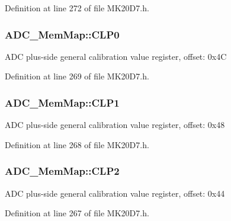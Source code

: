 Definition at line 272 of file M\+K20\+D7.\+h.

\subsubsection[{\texorpdfstring{C\+L\+P0}{CLP0}}]{ A\+D\+C\+\_\+\+Mem\+Map\+::\+C\+L\+P0}\hypertarget{struct_a_d_c___mem_map_a936082703bd7b18447b8edeeaa3c0c4f}{}\label{struct_a_d_c___mem_map_a936082703bd7b18447b8edeeaa3c0c4f}
A\+DC plus-\/side general calibration value register, offset\+: 0x4C 

Definition at line 269 of file M\+K20\+D7.\+h.

\subsubsection[{\texorpdfstring{C\+L\+P1}{CLP1}}]{ A\+D\+C\+\_\+\+Mem\+Map\+::\+C\+L\+P1}\hypertarget{struct_a_d_c___mem_map_ae99b44e06b93a2b62451162abe0aae92}{}\label{struct_a_d_c___mem_map_ae99b44e06b93a2b62451162abe0aae92}
A\+DC plus-\/side general calibration value register, offset\+: 0x48 

Definition at line 268 of file M\+K20\+D7.\+h.

\subsubsection[{\texorpdfstring{C\+L\+P2}{CLP2}}]{ A\+D\+C\+\_\+\+Mem\+Map\+::\+C\+L\+P2}\hypertarget{struct_a_d_c___mem_map_aac028a79faac6929bebb1b677b2fbf8b}{}\label{struct_a_d_c___mem_map_aac028a79faac6929bebb1b677b2fbf8b}
A\+DC plus-\/side general calibration value register, offset\+: 0x44 

Definition at line 267 of file M\+K20\+D7.\+h.

